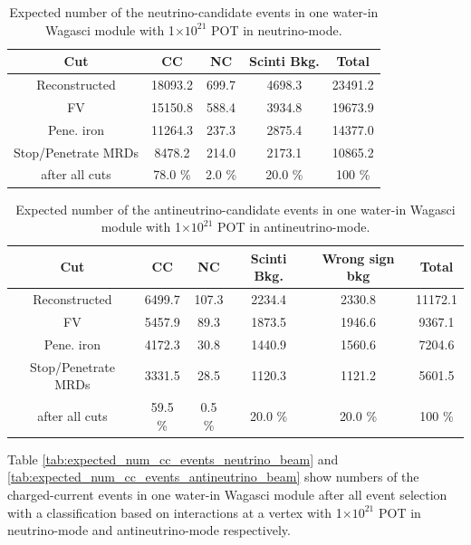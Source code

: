 \begin{table}[htb]
  \begin{center}
    \caption{Expected number of the neutrino-candidate events in one water-in Wagasci module with 1$\times 10^{21}$ POT in neutrino-mode.}
    \begin{tabular}{c|ccc|c} \hline
Cut   & CC & NC & Scinti Bkg. & Total \\ \hline
Reconstructed & 18093.2 & 699.7 & 4698.3 & 23491.2 \\
FV & 15150.8 & 588.4 & 3934.8 & 19673.9 \\
Pene. iron & 11264.3 & 237.3 & 2875.4 & 14377.0 \\
Stop/Penetrate MRDs & 8478.2 & 214.0 & 2173.1 & 10865.2 \\ \hline
after all cuts & 78.0 \% & 2.0 \% & 20.0 \% & 100 \% \\
\hline
    \end{tabular}
    \label{tab:expected_num_events_neutrino_beam}
  \end{center}
\end{table}

\begin{table}[htb]
  \begin{center}
    \caption{Expected number of the antineutrino-candidate events in one water-in Wagasci module with 1$\times 10^{21}$ POT in antineutrino-mode.}
    \begin{tabular}{c|cccc|c} \hline
 Cut   & CC & NC & Scinti Bkg. & Wrong sign bkg & Total \\ \hline
Reconstructed & 6499.7 & 107.3 & 2234.4 & 2330.8 & 11172.1 \\ 
FV & 5457.9 & 89.3 & 1873.5 & 1946.6 & 9367.1 \\ 
Pene. iron & 4172.3 & 30.8 & 1440.9 & 1560.6 & 7204.6 \\ 
Stop/Penetrate MRDs & 3331.5 & 28.5 & 1120.3 & 1121.2 & 5601.5 \\ \hline
after all cuts & 59.5 \% & 0.5 \% & 20.0 \% &  20.0 \% & 100 \% \\
\hline
    \end{tabular}
    \label{tab:expected_num_events_antineutrino_beam}
  \end{center}
\end{table}


Table \ref{tab:expected_num_cc_events_neutrino_beam} and \ref{tab:expected_num_cc_events_antineutrino_beam}  show numbers of the charged-current events in one water-in Wagasci module after all event selection with a classification based on interactions at a vertex with 1$\times 10^{21}$ POT in neutrino-mode and antineutrino-mode respectively.

